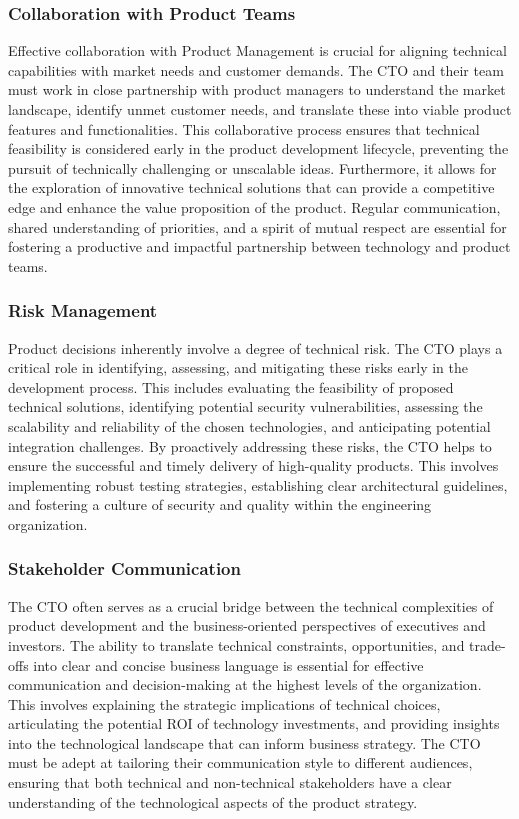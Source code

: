 \subsubsection{Collaboration with Product Teams}
Effective collaboration with Product Management is crucial for aligning technical capabilities with market needs and customer demands. The \gls{CTO} and their team must work in close partnership with product managers to understand the market landscape, identify unmet customer needs, and translate these into viable product features and functionalities. This collaborative process ensures that technical feasibility is considered early in the product development lifecycle, preventing the pursuit of technically challenging or unscalable ideas. Furthermore, it allows for the exploration of innovative technical solutions that can provide a competitive edge and enhance the value proposition of the product. Regular communication, shared understanding of priorities, and a spirit of mutual respect are essential for fostering a productive and impactful partnership between technology and product teams.

\subsubsection{Risk Management}
Product decisions inherently involve a degree of technical risk. The \gls{CTO} plays a critical role in identifying, assessing, and mitigating these risks early in the development process. This includes evaluating the feasibility of proposed technical solutions, identifying potential security vulnerabilities, assessing the scalability and reliability of the chosen technologies, and anticipating potential integration challenges. By proactively addressing these risks, the \gls{CTO} helps to ensure the successful and timely delivery of high-quality products. This involves implementing robust testing strategies, establishing clear architectural guidelines, and fostering a culture of security and quality within the engineering organization.

\subsubsection{Stakeholder Communication}
The \gls{CTO} often serves as a crucial bridge between the technical complexities of product development and the business-oriented perspectives of executives and investors. The ability to translate technical constraints, opportunities, and trade-offs into clear and concise business language is essential for effective communication and decision-making at the highest levels of the organization. This involves explaining the strategic implications of technical choices, articulating the potential \gls{ROI} of technology investments, and providing insights into the technological landscape that can inform business strategy. The \gls{CTO} must be adept at tailoring their communication style to different audiences, ensuring that both technical and non-technical stakeholders have a clear understanding of the technological aspects of the product strategy.

